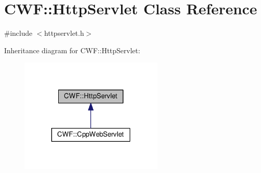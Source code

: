 \hypertarget{class_c_w_f_1_1_http_servlet}{\section{C\+W\+F\+:\+:Http\+Servlet Class Reference}
\label{class_c_w_f_1_1_http_servlet}
}


{\ttfamily \#include $<$httpservlet.\+h$>$}



Inheritance diagram for C\+W\+F\+:\+:Http\+Servlet\+:
\nopagebreak
\begin{figure}[H]
\begin{center}
\leavevmode
\includegraphics[width=195pt]{class_c_w_f_1_1_http_servlet__inherit__graph}
\end{center}
\end{figure}

